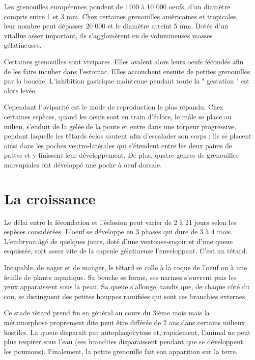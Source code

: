         Les grenouilles européennes pondent de 1400 à 10 000 oeufs, d’un diamètre compris entre 1 et 3 mm. Chez certaines grenouilles américaines et tropicales, leur nombre peut dépasser 20 000 et le diamètre atteint 5 mm. Dotés d’un vitallus assez important, ils s’agglomèrent en de volumineuses masses gélatineuses.

        Certaines grenouilles sont vivipares. Elles avalent alors leurs oeufs fécondés afin de les faire incuber dans l’estomac. Elles accouchent ensuite de petites grenouilles par la bouche. L’inhibition gastrique maintenue pendant toute la " gestation " est alors levée.

        Cependant l’oviparité est le mode de reproduction le plus répandu. Chez certaines espèces, quand les oeufs sont en train d’éclore, le mâle se place au milieu, s’enduit de la gelée de la ponte et entre dans une torpeur progressive, pendant laquelle les têtards éclos sautent afin d’escalader son corps ; ils se placent ainsi dans les poches ventro-latérales qui s’étendent entre les deux paires de pattes et y finissent leur développement. De plus, quatre genres de grenouilles marsupiales ont développé une poche à oeuf dorsale.

         

\section{La croissance}

        Le délai entre la fécondation et l’éclosion peut varier de 2 à 21 jours selon les espèces considérées. L’oeuf se développe en 3 phases qui dure de 3 à 4 mois. L’embryon âgé de quelques jours, doté d’une ventouse-suçoir et d’une queue esquissée, sort assez vite de la capsule gélatineuse l’enveloppant. C’est un têtard.

        Incapable, de nager et de manger, le têtard se colle à la coque de l’oeuf ou à une feuille de plante aquatique. Sa bouche se forme, ses narines s’ouvrent puis les yeux apparaissent sous la peau. Sa queue s’allonge, tandis que, de chaque côté du cou, se distinguent des petites houppes ramifiées qui sont ces branchies externes.

        Ce stade têtard prend fin en général au cours du 3ième mois mais la métamorphose proprement dite peut être différée de 2 ans dans certains milieux hostiles. La queue disparaît par autophagocytose et, rapidement, l’animal ne peut plus respirer sous l’eau (ses branchies disparaissent pendant que se développent les poumons). Finalement, la petite grenouille fait son apparition sur la terre.

